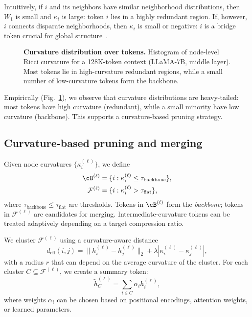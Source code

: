 \documentclass{article}
\theoremstyle{plain}
\theoremstyle{definition}
\theoremstyle{remark}
\newcommand{\cF}{\mathcal{F}}
\begin{document}
Intuitively, if $i$ and its neighbors have similar neighborhood distributions, then $W_1$ is small and $\kappa_i$ is large: token $i$ lies in a highly redundant region. If, however, $i$ connects disparate neighborhoods, then $\kappa_i$ is small or negative: $i$ is a bridge token crucial for global structure~\citep{ni2019community,sia2019ollivier}.

\begin{figure}[t]
  \centering
  \fbox{\rule{0pt}{1.25in}\rule{0.95\columnwidth}{0pt}}
  \caption{\textbf{Curvature distribution over tokens.} Histogram of node-level Ricci curvature for a 128K-token context (LLaMA-7B, middle layer). Most tokens lie in high-curvature redundant regions, while a small number of low-curvature tokens form the backbone.}
  \label{fig:curvature-hist}
\end{figure}

Empirically (Fig.~\ref{fig:curvature-hist}), we observe that curvature distributions are heavy-tailed: most tokens have high curvature (redundant), while a small minority have low curvature (backbone). This supports a curvature-based pruning strategy.

\subsection{Curvature-based pruning and merging}

Given node curvatures $\{\kappa^{(\ell)}_i\}$, we define
\begin{align}
  \cB^{(\ell)} &= \{ i : \kappa^{(\ell)}_i \le \tau_\mathrm{backbone} \}, \\
  \cF^{(\ell)} &= \{ i : \kappa^{(\ell)}_i > \tau_\mathrm{flat} \},
\end{align}
where $\tau_\mathrm{backbone} \le \tau_\mathrm{flat}$ are thresholds. Tokens in $\cB^{(\ell)}$ form the \emph{backbone}; tokens in $\cF^{(\ell)}$ are candidates for merging. Intermediate-curvature tokens can be treated adaptively depending on a target compression ratio.

We cluster $\cF^{(\ell)}$ using a curvature-aware distance
\begin{equation}
  d_\mathrm{eff}(i,j) = \|h^{(\ell)}_i - h^{(\ell)}_j\|_2 + \lambda |\kappa^{(\ell)}_i - \kappa^{(\ell)}_j|,
\end{equation}
with a radius $r$ that can depend on the average curvature of the cluster. For each cluster $C \subseteq \cF^{(\ell)}$, we create a summary token:
\begin{equation}
  \tilde{h}^{(\ell)}_C = \sum_{i \in C} \alpha_i h^{(\ell)}_i,
\end{equation}
where weights $\alpha_i$ can be chosen based on positional encodings, attention weights, or learned parameters.
\end{document}
